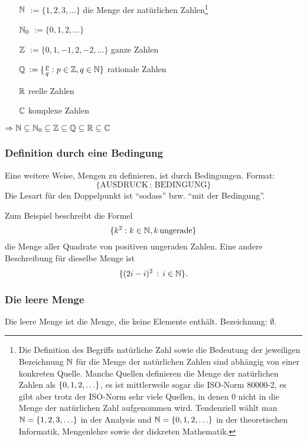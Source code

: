 \begin{itemize}
	\item[$ \mathbb N $] $ := \{ 1,2,3,\ldots \} $ die Menge der natürlichen Zahlen\footnote{Die Definition des Begriffs natürliche Zahl sowie die Bedeutung der jeweiligen Bezeichnung $\mathbb N$ für die Menge der natürlichen Zahlen sind abhängig von einer konkreten Quelle.  Manche Quellen definieren die Menge der natürlichen Zahlen als $ \left\{ 0,1,2,\ldots \right\} $, es ist mittlerweile sogar die ISO-Norm 80000-2, es gibt aber trotz der ISO-Norm sehr viele Quellen, in denen $0$ nicht in die Menge der natürlichen Zahl aufgenommen wird. Tendenziell wählt man  $\mathbb N = \{1,2,3,\ldots \}$ in der Analysis und $\mathbb N = \{0,1,2,\ldots\}$ in der theoretischen Informatik, Mengenlehre sowie der diskreten Mathematik.}
	\item[$ \mathbb N_0 $] $ := \{ 0,1,2,\ldots \} $
	\item[$ \mathbb Z $] $ := \{ 0,1,-1,2,-2,\ldots \} $ ganze Zahlen
	\item[$ \mathbb Q $] $ := \{ \frac{p}{q} : p \in \mathbb Z, q \in \mathbb N \} $ rationale Zahlen
	\item[$ \mathbb R $] reelle Zahlen
	\item[$ \mathbb C $] komplexe Zahlen
\end{itemize}

\noindent $ \Rightarrow \mathbb N \subseteq \mathbb N_0 \subseteq \mathbb Z \subseteq \mathbb Q \subseteq \mathbb R \subseteq \mathbb C $


\subsubsection{Definition durch eine Bedingung}

Eine weitere Weise, Mengen zu definieren, ist durch Bedingungen. Format:
\[
			 \{ \text{AUSDRUCK} \,  : \, \text{BEDINGUNG} \}
\]
Die Lesart für den Doppelpunkt ist ``sodass''  bzw.  ``mit der Bedingung''.

Zum Beispiel beschreibt die Formel
 \[
 	\{ k^2 : k \in \mathbb N, k \, \text{ungerade} \} 
 \] die Menge aller Quadrate von positiven ungeraden Zahlen. Eine andere Beschreibung für dieselbe Menge ist 
 \[
 	\{  (2i -i)^2  \, :\, i \in \mathbb N\}.
 \] 



\subsubsection{Die leere Menge}

Die leere Menge ist die Menge, die keine Elemente enthält. Bezeichnung: $ \emptyset $.

